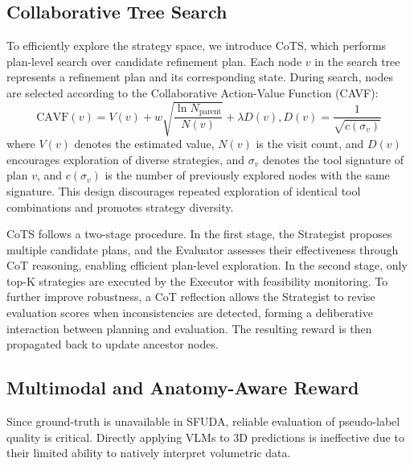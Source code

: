 \documentclass[sigconf, screen]{acmart}
\begin{document}
\subsection{Collaborative Tree Search}
To efficiently explore the strategy space, we introduce CoTS, which performs plan-level search over candidate refinement plan. Each node $v$ in the search tree represents a refinement plan and its corresponding state. During search, nodes are selected according to the Collaborative Action-Value Function (CAVF):
\begin{equation}
\text{CAVF}(v)=V(v)+w\sqrt{\frac{\ln N_{\text{parent}}}{N(v)}}+\lambda D(v), D(v)=\frac{1}{\sqrt{c(\sigma_v)}}
\end{equation}
where $V(v)$ denotes the estimated value, $N(v)$ is the visit count, and $D(v)$ encourages exploration of diverse strategies, and $\sigma_v$ denotes the tool signature of plan $v$, and $c(\sigma_v)$ is the number of previously explored nodes with the same signature. This design discourages repeated exploration of identical tool combinations and promotes strategy diversity.

CoTS follows a two-stage procedure. In the first stage, the Strategist proposes multiple candidate plans, and the Evaluator assesses their effectiveness through CoT reasoning, enabling efficient plan-level exploration. In the second stage, only top-K strategies are executed by the Executor with feasibility monitoring. To further improve robustness, a CoT reflection allows the Strategist to revise evaluation scores when inconsistencies are detected, forming a deliberative interaction between planning and evaluation. The resulting reward is then propagated back to update ancestor nodes.

\subsection{Multimodal and Anatomy-Aware Reward}
Since ground-truth is unavailable in SFUDA, reliable evaluation of pseudo-label quality is critical. Directly applying VLMs to 3D predictions is ineffective due to their limited ability to natively interpret volumetric data.
\end{document}
